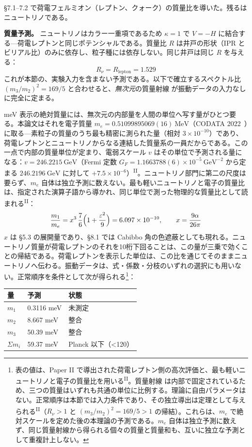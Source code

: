 \documentclass[fontsize=11pt,paper=a4,lualatex]{jlreq}
\newcommand{\PII}{\textsuperscript{\textup{II}}}
\begin{document}
§7.1--7.2 で荷電フェルミオン（レプトン、クォーク）の質量比を導いた。残るはニュートリノである。

\noindent\textbf{質量予測。}
ニュートリノはカラー一重項であるため $\kappa = 1$ で $V = -H$ に結合する---荷電レプトンと同じポテンシャルである。質量比 $R$ は井戸の形状（IPR とビリアル比）のみに依存し、粒子種には依存しない。同じ井戸は同じ $R$ を与える：
\[R_\nu = R_\mathrm{lepton} = 1.529\]
これが本節の、実験入力を含まない予測である。以下で確立するスペクトル比 $(m_3/m_2)^2 = 169/5$ と合わせると、\emph{無次元}の質量射線 が振動データの入力なしに完全に定まる。

meV 表示の絶対質量には、無次元の内部量を人間の単位へ写す量がひとつ要る。本論文はそれを電子質量 $m_e = 0.51099895069(16)~\mathrm{MeV}$（CODATA 2022~\cite{codata}）に取る---素粒子の質量のうち最も精密に測られた量（相対 $3\times10^{-10}$）であり、荷電レプトンとニュートリノからなる連結した質量系の一員だからである。この一点で内部の質量単位が定まり、電弱スケール $v$ はその単位で予測される量になる：$v = 246.2215~\mathrm{GeV}$（Fermi 定数 $G_F = 1.1663788(6)\times10^{-5}~\mathrm{GeV}^{-2}$ から定まる $246.2196~\mathrm{GeV}$ に対して $+7.5\times10^{-6}$）\PII{}。ニュートリノ部門に第二の尺度は要らず、$m_e$ 自体は独立予測に数えない。最も軽いニュートリノと電子の質量比は、指定された演算子語から導かれ、同じ単位で測った物理的な質量比として読まれる\PII{}：
\[\frac{m_1}{m_e} = x^3\,\frac{7}{6}\Bigl(1 + \frac{\varepsilon^2}{9}\Bigr) = 6.097 \times 10^{-10},\qquad x = \frac{9\alpha}{26\pi}\]
$x$ は §5.3 の展開量であり、§8.1 では Cabibbo 角の色遮蔽としても現れる。ニュートリノ質量が荷電レプトンのそれを10桁下回ることは、この量が三乗で効くことの帰結である。荷電レプトンを表示した単位は、この比を通じてそのままニュートリノへ伝わる。振動データは、式・係数・分枝のいずれの選択にも用いない。正常順序を条件として次が得られる\footnote{表の値は、Paper II で導出された荷電レプトン側の高次評価と、最も軽いニュートリノと電子の質量比を用いる\PII{}。質量射線 は内部で固定されているため、三つの質量はいずれも共通の単位に比例する。理論に自由パラメータはない。正常順序は本節では入力条件であり、その独立導出は定理として与えられる\PII{}（$R_\nu > 1$ と $(m_3/m_2)^2 = 169/5 > 1$ の帰結）。これらは、$m_e$ で絶対スケールを定めた後の本理論の予測である。$m_e$ 自体は独立予測に数えず、同じ質量射線から得られる個々の質量と質量和も、互いに独立な予測として重複計上しない。}：

\begin{longtable}[]{@{}lll@{}}
\toprule\noalign{}
量 & 予測 & 状態 \\
\midrule\noalign{}
\endhead
\bottomrule\noalign{}
\endlastfoot
$m_1$ & 0.3116 meV & 未測定 \\
$m_2$ & 8.667 meV & 整合 \\
$m_3$ & 50.39 meV & 整合 \\
$\Sigma m_i$ & 59.37 meV & Planck 以下（\textless120） \\
\end{longtable}
\end{document}
